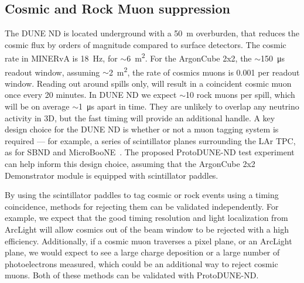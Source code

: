 \subsection{Cosmic and Rock Muon suppression}
\label{sec:cosmic-suppression}

The DUNE ND is located underground with a \SI{50}{\metre} overburden, that reduces the cosmic flux by orders of magnitude compared to surface detectors. The cosmic rate in MINERvA is \SI{18}{\hertz}, for $\sim$\SI{6}{\metre\squared}.  For the ArgonCube 2x2, the $\sim$\SI{150}{\micro\second} readout window, assuming $\sim$\SI{2}{\metre\squared}, the rate of cosmics muons is 0.001 per readout window. Reading out around spills only, will result in a coincident cosmic muon once every 20 minutes.
In DUNE ND we expect $\sim$10 rock muons per spill, which will be on average $\sim$\SI{1}{\micro\second} apart in time. They are unlikely to overlap any neutrino activity in 3D, but the fast timing will provide an additional handle.
A key design choice for the DUNE ND is whether or not a muon tagging system is required --- for example, a series of scintillator planes surrounding the LAr TPC, as for SBND and MicroBooNE~\cite{CRT}. The proposed ProtoDUNE-ND test experiment can help inform this design choice, assuming that the ArgonCube 2x2 Demonstrator module is equipped with scintillator paddles.

By using the scintillator paddles to tag cosmic or rock events using a timing coincidence, methods for rejecting them can be validated independently. For example, we expect that the good timing resolution and light localization from ArcLight will allow cosmics out of the beam window to be rejected with a high efficiency. Additionally, if a cosmic muon traverses a pixel plane, or an ArcLight plane, we would expect to see a large charge deposition or a large number of photoelectrons measured, which could be an additional way to reject cosmic muons. Both of these methods can be validated with ProtoDUNE-ND.

